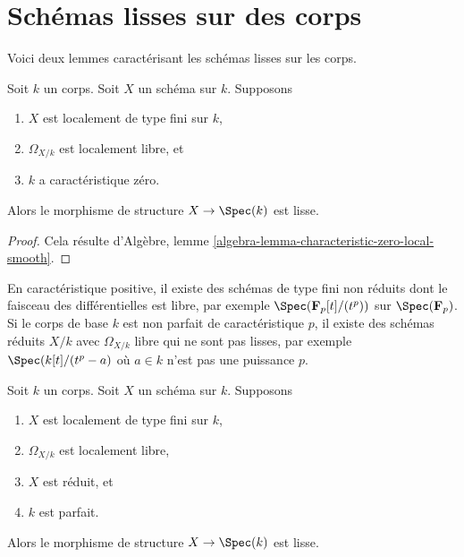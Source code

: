 \section{Schémas lisses sur des corps} 
\label{section-smooth}

\noindent
 Voici deux lemmes caractérisant les schémas lisses sur les corps.

\begin{lemma}
\label{lemma-char-zero-differentials-free-smooth}
 Soit $k$ un corps. Soit $X$ un schéma sur $k$.
Supposons 
\begin{enumerate}
\item $X$ est localement de type fini sur $k$, 
\item $\Omega_{X/k}$ est localement libre, et 
\item $k$ a caractéristique zéro. 
\end{enumerate}
 Alors le morphisme de structure $X \to \Spec(k)$ est lisse. 
\end{lemma}

\begin{proof}
 Cela résulte
d'Algèbre, lemme \ref{algebra-lemma-characteristic-zero-local-smooth}. 
\end{proof}

\noindent
 En caractéristique positive, il existe des schémas de type fini
non réduits dont le faisceau des différentielles est libre, par exemple 
$\Spec(\mathbf{F}_p[t]/(t^p))$ sur $\Spec(\mathbf{F}_p)$.
Si le corps de base $k$ est non parfait de caractéristique $p$,
il existe des schémas réduits $X/k$ avec $\Omega_{X/k}$ libre qui
ne sont pas lisses, par exemple $\Spec(k[t]/(t^p-a)$ où $a \in k$
 n'est pas une puissance $p$.

\begin{lemma}
\label{lemma-char-p-differentials-free-smooth}
 Soit $k$ un corps. Soit $X$ un schéma sur $k$.
Supposons 
\begin{enumerate}
\item $X$ est localement de type fini sur $k$, 
\item $\Omega_{X/k}$ est localement libre, 
\item $X$ est réduit, et 
\item $k$ est parfait. 
\end{enumerate}
 Alors le morphisme de structure $X \to \Spec(k)$ est lisse. 
\end{lemma}

